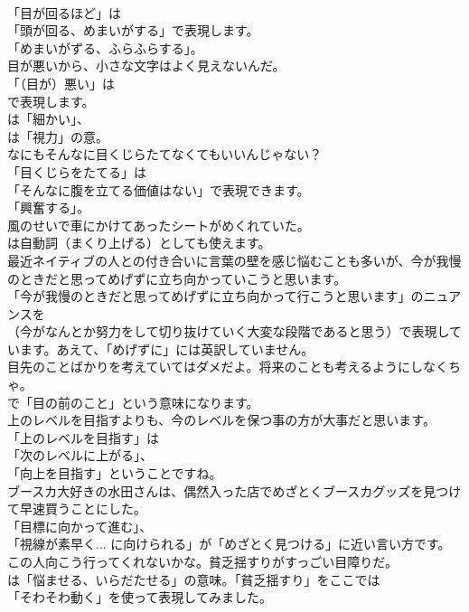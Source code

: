 \documentclass[8pt]{extreport}
\begin{document}
\begin{CJK}{UTF8}{min}
\\	「目が回るほど」は
\\	「頭が回る、めまいがする」で表現します。
\\	「めまいがずる、ふらふらする」。	
\\	目が悪いから、小さな文字はよく見えないんだ。 
\\	「（目が）悪い」は 
\\	で表現します。
\\	は「細かい」、
\\	は「視力」の意。	
\\	なにもそんなに目くじらたてなくてもいいんじゃない？ 
\\	「目くじらをたてる」は
\\	「そんなに腹を立てる価値はない」で表現できます。
\\	「興奮する」。	
\\	風のせいで車にかけてあったシートがめくれていた。 
\\	は自動詞（まくり上げる）としても使えます。	
\\	最近ネイティブの人との付き合いに言葉の壁を感じ悩むことも多いが、今が我慢のときだと思ってめげずに立ち向かっていこうと思います。 
\\	「今が我慢のときだと思ってめげずに立ち向かって行こうと思います」のニュアンスを 
\\	（今がなんとか努力をして切り抜けていく大変な段階であると思う）で表現しています。あえて、「めげずに」には英訳していません。	
\\	目先のことばかりを考えていてはダメだよ。将来のことも考えるようにしなくちゃ。 
\\	で「目の前のこと」という意味になります。	
\\	上のレベルを目指すよりも、今のレベルを保つ事の方が大事だと思います。 
\\	「上のレベルを目指す」は
\\	「次のレベルに上がる」、
\\	「向上を目指す」ということですね。	
\\	ブースカ大好きの水田さんは、偶然入った店でめざとくブースカグッズを見つけて早速買うことにした。 
\\	「目標に向かって進む」、
\\	「視線が素早く... に向けられる」が「めざとく見つける」に近い言い方です。	
\\	この人向こう行ってくれないかな。貧乏揺すりがすっごい目障りだ。 
\\	は「悩ませる、いらだたせる」の意味。「貧乏揺すり」をここでは
\\	「そわそわ動く」を使って表現してみました。	

\end{CJK}
\end{document}
